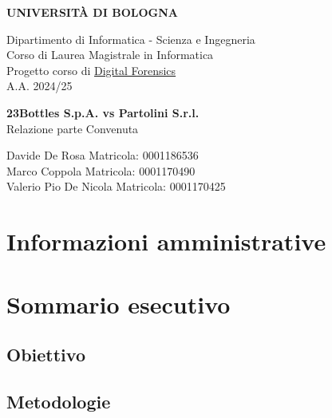 \documentclass[a4paper,12pt]{report}
\begin{document}
\begin{titlepage}
    \centering
    \vspace*{0.1cm}

    \Huge
    \textbf{UNIVERSITÀ DI BOLOGNA}

    \vspace{1cm}
    \Large
    Dipartimento di Informatica - Scienza e Ingegneria \\
    Corso di Laurea Magistrale in Informatica \\\vspace{1cm}
    Progetto corso di \href{https://www.unibo.it/it/studiare/dottorati-master-specializzazioni-e-altra-formazione/insegnamenti/insegnamento/2024/479039}{Digital Forensics} \\
    A.A. 2024/25

    \vspace{5.5cm}
    \textbf{\LARGE 23Bottles S.p.A. vs Partolini S.r.l.}\\\vspace{0.3cm}
    \Large Relazione parte Convenuta

    \vfill

    \vfill

    \large
    Davide De Rosa \hfill Matricola: 0001186536\\
    Marco Coppola \hfill Matricola: 0001170490\\
    Valerio Pio De Nicola \hfill Matricola: 0001170425\\
\end{titlepage}

\tableofcontents
\newpage

\chapter{Informazioni amministrative}


\pagebreak

\chapter{Sommario esecutivo}


\section{Obiettivo}


\section{Metodologie}

\end{document}
